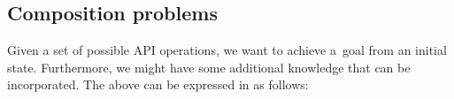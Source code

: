 % 
% 

\subsection{Composition problems}
\label{subsec:Definition}
Given a set of possible API operations,
we want to achieve a~goal from an initial state.
Furthermore, we might have some additional knowledge that can be incorporated.
The above can be expressed in \nthree as follows:

